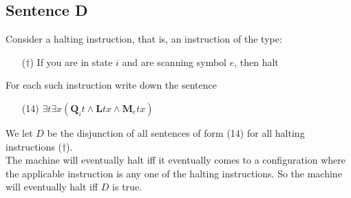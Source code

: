 \documentclass[
11pt,notheorems,hyperref={pdfauthor=whatever}
]{beamer}
\begin{document}
\subsection{Sentence D}
\begin{frame}
Consider a halting instruction, that is, an instruction of the type:
\vspace{1em}
\begin{enumerate}
    \item[($\dagger$)] If you are in state $i$ and are scanning symbol $e$, then halt
\end{enumerate}
\vspace{1em}
For each such instruction write down the sentence
\vspace{1em}
\begin{enumerate}
    \item[(14)] $\exists t\exists x(\pmb{Q}_i t \wedge \pmb{L}tx \wedge \pmb{M}_e tx)$
\end{enumerate}
\vspace{1em}
We let $D$ be the disjunction of all sentences of form (14) for all halting instructions ($\dagger$).\\
\vspace{1em}
The machine will eventually halt iff it eventually comes to a configuration where the applicable instruction is any one of the halting instructions. So the machine will eventually halt iff $D$ is true.
\end{frame}
\end{document}
